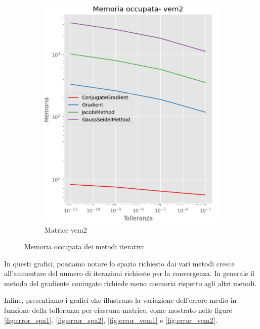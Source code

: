 \begin{figure}[!ht]
\begin{subfigure}{0.45\textwidth}
        \includegraphics[width=\textwidth]{./../report/Progetto_1_bis/img/mem_vem2.png}
        \caption{Matrice vem2}
        \label{fig:mem_vem2}
    \end{subfigure}
    \caption{Memoria occupata dei metodi iterativi}
    \label{fig:memory}
\end{figure}

In questi grafici, possiamo notare lo spazio richiesto dai vari metodi cresce
all'aumentare del numero di iterazioni richieste per la convergenza. In generale
il metodo del gradiente coniugato richiede meno memoria rispetto agli altri metodi.


Infine, presentiamo i grafici che illustrano la variazione dell'errore medio in
funzione della tolleranza per ciascuna matrice, come mostrato nelle figure \ref{fig:error_spa1},
\ref{fig:error_spa2}, \ref{fig:error_vem1} e \ref{fig:error_vem2}.

